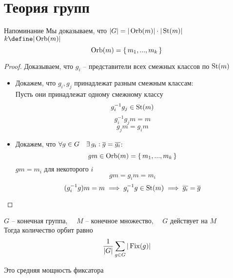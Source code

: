 \chapter{Теория групп}

\begin{undefthm}{Напоминание}
	Мы доказываем, что $ |G| = |\operatorname{Orb}(m)| \cdot |\operatorname{St}(m)| $ \\
    $ k \define |\Orb(m)| $
    $$ \operatorname{Orb}(m) = \set{m_1, ..., m_k} $$
\end{undefthm}

\begin{proof}
    Доказываем, что $ g_i $ -- представители всех смежных классов по $ \operatorname{St}(m) $
    \begin{itemize}
    	\item Докажем, что $ g_i, g_j $ принадлежат разным смежным классам: \\
        Пусть они принадлежат одному смежному классу
        $$ g_i^{-1}g_j \in \operatorname{St}(m) $$
        $$ g_i^{-1}g_jm = m $$
        $$ g_jm = g_im $$
        \item Докажем, что $ \forall g \in G \quad \exists\, g_i : \overline{g} = \overline{g_i} $:
        $$ gm \in \operatorname{Orb}(m) = \set{m_1, ..., m_k} $$
        $ gm = m_i $ для некоторого $ i $
        $$ gm = g_im = m_i $$
        $$ (g_i^{-1}g)m = m \implies g_i^{-1}g \in \operatorname{St}(m) \implies \overline{g_i} = \overline{g} $$
    \end{itemize}
\end{proof}

\begin{lemma}[Бернсамда]
	$ G $ -- конечная группа, $ \quad M $ -- конечное множество, $ \quad G $ действует на $ M $ \\
    Тогда количество орбит равно
    $$ \frac1{|G|} \sum_{g \in G} |\operatorname{Fix}(g)| $$
\end{lemma}

\begin{remark}
	Это средняя мощность фиксатора
\end{remark}

